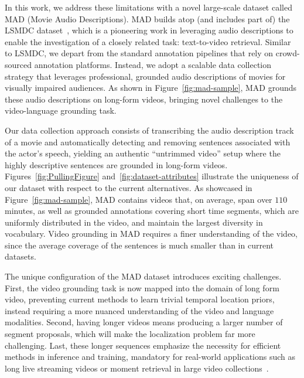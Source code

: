 \documentclass[10pt,twocolumn,letterpaper]{article}
\begin{document}
In this work, we address these limitations with a novel large-scale dataset called MAD (Movie Audio Descriptions). MAD builds atop (and includes part of) the LSMDC dataset~\cite{rohrbach2017movie}, which is a pioneering work in leveraging audio descriptions to enable the investigation of a closely related task: text-to-video retrieval. 
Similar to LSMDC, we depart from the standard annotation pipelines that rely on crowd-sourced annotation platforms. Instead, we adopt a scalable data collection strategy that leverages professional, grounded audio descriptions of movies for visually impaired audiences. As shown in Figure~\ref{fig:mad-sample}, MAD grounds these audio descriptions on long-form videos, bringing novel challenges to the video-language grounding task.

Our data collection approach consists of transcribing the audio description track of a movie and automatically detecting and removing sentences associated with the actor's speech, yielding an authentic ``untrimmed video'' setup where the highly descriptive sentences are grounded in long-form videos.
Figures~\ref{fig:PullingFigure} and~\ref{fig:dataset-attributes} illustrate the uniqueness of our dataset with respect to the current alternatives.  
As showcased in Figure~\ref{fig:mad-sample}, MAD contains videos that, on average, span over $110$ minutes, as well as grounded annotations covering short time segments, which are uniformly distributed in the video, and maintain the largest diversity in vocabulary.
Video grounding in MAD requires a finer understanding of the video, since the average coverage of the sentences is much smaller than in current datasets. 

The unique configuration of the MAD dataset introduces exciting challenges. 
First, the video grounding task is now mapped into the domain of long form video, preventing current methods to learn trivial temporal location priors, instead requiring a more nuanced understanding of the video and language modalities.
Second, having longer videos means producing a larger number of segment proposals, which will make the localization problem far more challenging. 
Last, these longer sequences emphasize the necessity for efficient methods in inference and training, mandatory for real-world applications such as long live streaming videos or moment retrieval in large video collections~\cite{escorcia2019temporal}. 
\end{document}
